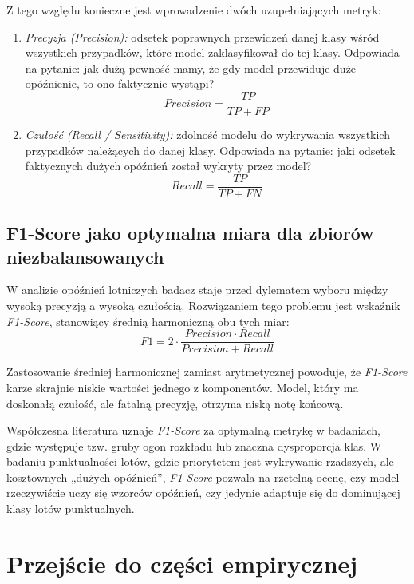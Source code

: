 Z tego względu konieczne jest wprowadzenie dwóch uzupełniających metryk:
\begin{enumerate}
    \item \textit{Precyzja (Precision):} odsetek poprawnych przewidzeń danej klasy wśród wszystkich przypadków, które model zaklasyfikował do tej klasy. Odpowiada na pytanie: jak dużą pewność mamy, że gdy model przewiduje duże opóźnienie, to ono faktycznie wystąpi?
    \begin{equation}
        Precision = \frac{TP}{TP + FP}
    \end{equation}
    \item \textit{Czułość (Recall / Sensitivity):} zdolność modelu do wykrywania wszystkich przypadków należących do danej klasy. Odpowiada na pytanie: jaki odsetek faktycznych dużych opóźnień został wykryty przez model?
    \begin{equation}
        Recall = \frac{TP}{TP + FN}
    \end{equation}
\end{enumerate}

\subsection{F1-Score jako optymalna miara dla zbiorów niezbalansowanych}

W analizie opóźnień lotniczych badacz staje przed dylematem wyboru między wysoką precyzją a wysoką czułością. Rozwiązaniem tego problemu jest wskaźnik \textit{F1-Score}, stanowiący średnią harmoniczną obu tych miar:
\begin{equation}
    F1 = 2 \cdot \frac{Precision \cdot Recall}{Precision + Recall}
\end{equation}

Zastosowanie średniej harmonicznej zamiast arytmetycznej powoduje, że \textit{F1-Score} karze skrajnie niskie wartości jednego z komponentów. Model, który ma doskonałą czułość, ale fatalną precyzję, otrzyma niską notę końcową. 

Współczesna literatura \cite{albassam2025, hastie2009} uznaje \textit{F1-Score} za optymalną metrykę w badaniach, gdzie występuje tzw. gruby ogon rozkładu lub znaczna dysproporcja klas. W badaniu punktualności lotów, gdzie priorytetem jest wykrywanie rzadszych, ale kosztownych „dużych opóźnień”, \textit{F1-Score} pozwala na rzetelną ocenę, czy model rzeczywiście uczy się wzorców opóźnień, czy jedynie adaptuje się do dominującej klasy lotów punktualnych.

\section*{Przejście do części empirycznej}

